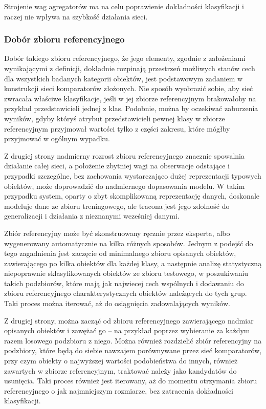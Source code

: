 \documentclass{pracalicmgr}
\begin{document}
    Strojenie wag agregatorów ma na celu poprawienie dokładności klasyfikacji i raczej nie wpływa na szybkość działania sieci.
    \subsubsection{Dobór zbioru referencyjnego} \label{training:ref}
    Dobór takiego zbioru referencyjnego, że jego elementy, zgodnie z założeniami wynikającymi z definicji, dokładnie rozpinają przestrzeń możliwych stanów cech dla wszystkich badanych kategorii obiektów, jest podstawowym zadaniem w konstrukcji sieci komparatorów złożonych. Nie sposób wyobrazić sobie, aby sieć zwracała właściwe klasyfikacje, jeśli w jej zbiorze referencyjnym brakowałoby na przykład przedstawicieli jednej z klas. Podobnie, można by oczekiwać zaburzenia wyników, gdyby któryś atrybut przedstawicieli pewnej klasy w zbiorze referencyjnym przyjmował wartości tylko z części zakresu, które mógłby przyjmować w ogólnym wypadku.
    
    Z drugiej strony nadmierny rozrost zbioru referencyjnego znacznie spowalnia działanie całej sieci, a położenie zbytniej wagi na obserwacje odstające i przypadki szczególne, bez zachowania wystarczająco dużej reprezentacji typowych obiektów, może doprowadzić do nadmiernego dopasowania modelu. W takim przypadku system, oparty o zbyt skomplikowaną reprezentację danych, doskonale modeluje dane ze zbioru treningowego, ale tracona jest jego zdolność do generalizacji i działania z nieznanymi wcześniej danymi.
    
    Zbiór referencyjny może być skonstruowany ręcznie przez eksperta, albo wygenerowany automatycznie na kilka różnych sposobów. Jednym z podejść do tego zagadnienia jest zaczęcie od minimalnego zbioru opisanych obiektów, zawierającego po kilka obiektów dla każdej klasy, a następnie analizę statystyczną niepoprawnie sklasyfikowanych obiektów ze zbioru testowego, w poszukiwaniu takich podzbiorów, które mają jak najwiecej cech wspólnych i dodawaniu do zbioru referencyjnego charakterystycznych obiektów należących do tych grup. Taki proces można iterować, aż do osiągnięcia zadowalających wyników.
    
    Z drugiej strony, można zacząć od zbioru referencyjnego zawierającego nadmiar opisanych obiektów i zawężać go -- na przykład poprzez wybieranie za każdym razem losowego podzbioru z niego. Można również rozdzielić zbiór referencyjny na podzbiory, które będą do siebie nawzajem porównywane przez sieć komparatorów, przy czym obiekty o najwyższej wartości podobieństwa do innych, również zawartych w zbiorze referencyjnym, traktować należy jako kandydatów do usunięcia. Taki proces również jest iterowany, aż do momentu otrzymania zbioru referencyjnego o jak najmniejszym rozmiarze, bez zatracenia dokładności klasyfikacji.
    
\end{document}
